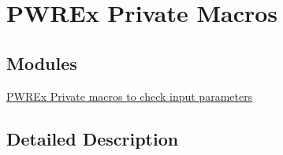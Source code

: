 \hypertarget{group___p_w_r_ex___private___macros}{}\section{P\+W\+R\+Ex Private Macros}
\label{group___p_w_r_ex___private___macros}
\subsection*{Modules}
\begin{DoxyCompactItemize}
\item 
\hyperlink{group___p_w_r_ex___i_s___p_w_r___definitions}{P\+W\+R\+Ex Private macros to check input parameters}
\end{DoxyCompactItemize}


\subsection{Detailed Description}
